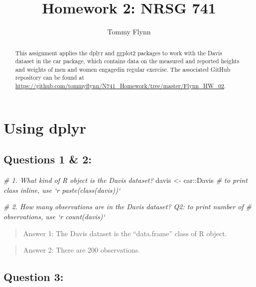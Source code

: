 \documentclass[]{elsarticle} %
\newenvironment{Shaded}{\begin{snugshade}}{\end{snugshade}}
\newcommand{\StringTok}[1]{\textcolor[rgb]{0.31,0.60,0.02}{{#1}}}
\newcommand{\CommentTok}[1]{\textcolor[rgb]{0.56,0.35,0.01}{\textit{{#1}}}}
\newcommand{\NormalTok}[1]{{#1}}
\begin{document}
\begin{frontmatter}

  \title{Homework 2: NRSG 741}
    \author[Emory University]{Tommy Flynn}
      \address[Emory University]{Emory School of Nursing 1520 Clifton Rd Atlanta GA 30322}
  
  \begin{abstract}
  This assignment applies the dplyr and ggplot2 packages to work with the
  Davis dataset in the car package, which contains data on the measured
  and reported heights and weights of men and women engagedin regular
  exercise. The associated GitHub repository can be found at
  \url{https://github.com/tommyflynn/N741_Homework/tree/master/Flynn_HW_02}.
  \end{abstract}
  
 \end{frontmatter}

\section{Using dplyr}\label{using-dplyr}

\subsection{Questions 1 \& 2:}\label{questions-1-2}

\begin{Shaded}
\begin{Highlighting}[]
\CommentTok{# 1. What kind of R object is the Davis dataset?}
\NormalTok{davis <-}\StringTok{ }\NormalTok{car::Davis}
\CommentTok{# to print class inline, use `r paste(class(davis))`}

\CommentTok{# 2. How many observations are in the Davis dataset? Q2: to print number of}
\CommentTok{# observations, use `r count(davis)`}
\end{Highlighting}
\end{Shaded}

\begin{quote}
Answer 1: The Davis dataset is the ``data.frame'' class of R object.
\end{quote}

\begin{quote}
Answer 2: There are 200 observations.
\end{quote}

\subsection{Question 3:}\label{question-3}
\end{document}
